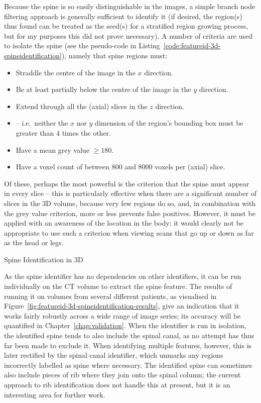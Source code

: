 Because the spine is so easily distinguishable in the images, a simple branch node filtering approach is generally sufficient to identify it (if desired, the region(s) thus found can be treated as the seed(s) for a stratified region growing process, but for my purposes this did not prove necessary). A number of criteria are used to isolate the spine (see the pseudo-code in Listing~\ref{code:featureid-3d-spineidentification}), namely that spine regions must:
%
\begin{itemize}

\item Straddle the centre of the image in the $x$ direction.
\item Be at least partially below the centre of the image in the $y$ direction.
\item Extend through all the (axial) slices in the $z$ direction.
\item {} -- i.e.~neither the $x$ nor $y$ dimension of the region's bounding box must be greater than $4$ times the other.
\item Have a mean grey value $\ge 180$.
\item Have a voxel count of between $800$ and $8000$ voxels per (axial) slice.

\end{itemize}
%
Of these, perhaps the most powerful is the criterion that the spine must appear in every slice -- this is particularly effective when there are a significant number of slices in the 3D volume, because very few regions do so, and, in combination with the grey value criterion, more or less prevents false positives. However, it must be applied with an awareness of the  location in the body: it would clearly not be appropriate to use such a criterion when viewing scans that go up or down as far as the head or legs.

\begin{stulisting}[t]
\caption{Spine Identification in 3D}
\label{code:featureid-3d-spineidentification}

\end{stulisting}

As the spine identifier has no dependencies on other identifiers, it can be run individually on the CT volume to extract the spine feature. The results of running it on volumes from several different patients, as visualised in Figure~\ref{fig:featureid-3d-spineidentification-results}, give an indication that it works fairly robustly across a wide range of image series; its accuracy will be quantified in Chapter~\ref{chap:validation}. When the identifier is run in isolation, the identified spine tends to also include the spinal canal, as no attempt has thus far been made to exclude it. When identifying multiple features, however, this is later rectified by the spinal canal identifier, which unmarks any regions incorrectly labelled as spine where necessary. The identified spine can sometimes also include pieces of rib where they join onto the spinal column; the current approach to rib identification does not handle this at present, but it is an interesting area for further work.

